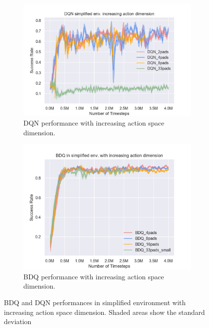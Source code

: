 \begin{figure}[!htbp]
    \begin{subfigure}{0.49\textwidth}
        \includegraphics[width=\linewidth]{figures/DQN_simplified_env_increasing_action_dimension}
        \caption{DQN performance with increasing action space dimension.} \label{fig:dqnincrease}
    \end{subfigure}%
    \hspace*{\fill}   %
    \begin{subfigure}{0.49\textwidth}
        \includegraphics[width=\linewidth]{figures/BDQ_in_simplified_env_with_increasing_action_dimension}
        \caption{BDQ performance with increasing action space dimension.} \label{fig:bdqincrease}
    \end{subfigure}%
    \hspace*{\fill}   %


\caption{BDQ and DQN performances in simplified environment with increasing action space dimension. Shaded areas show the standard deviation \label{fig:scenes}}
\end{figure}




